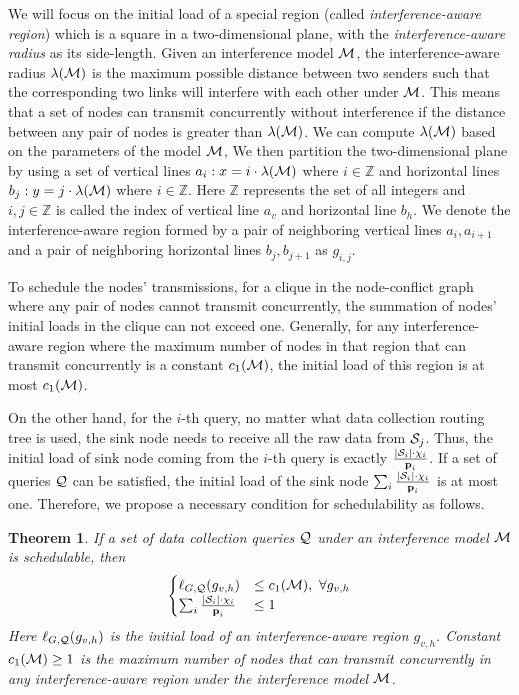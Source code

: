 \documentclass[conference,10pt]{IEEEtran}\usepackage{amsmath}
\newtheorem{boldtheorem}{\textbf{Theorem}}
\def\sources{{\cal S}}
\def\processing{{\chi}}
\def\queryset{{\cal Q}}
\def\period{{\textbf p}}
\def\initiaload{{\ell}}
\def\regionlenth{{\lambda}}
\begin{document}
We will focus on the initial load of a special
region
 (called \emph{interference-aware region})
 which is a square in a two-dimensional plane, with the \emph{interference-aware radius} as its side-length.
Given an interference model $\cal M$, the {interference-aware
radius}
 $\regionlenth({\cal M})$ is the
 maximum possible distance between two senders such that the
 corresponding two links will interfere with each other under $\cal M$.
This means that a set of nodes can transmit concurrently without
interference  if the distance between
 any pair of nodes is greater than
$\regionlenth(\cal M)$.
We can compute $\regionlenth(\cal M)$ based
on the parameters of the
 model $\cal M$,
We then partition the two-dimensional plane by using a set of
vertical lines
 $a_i: x=i \cdot \regionlenth({\cal M})$ where $i\in \mathbb{Z}$
 and horizontal lines $b_j: y=j\cdot \regionlenth({\cal M})$ where
 $i\in \mathbb{Z}$.
Here $\mathbb{Z}$ represents the set of all integers
 and $i, j\in \mathbb{Z}$ is called the index of vertical line $a_v$ and
 horizontal line $b_h$.
We denote the {interference-aware region} formed by a pair of neighboring vertical lines
$a_{i}, a_{i+1}$ and a pair of neighboring horizontal lines $b_{j},
 b_{j+1}$ as $g_{i, j}$.

To schedule the nodes' transmissions,
 for a clique in the node-conflict graph where any pair of nodes cannot transmit concurrently,
 the summation of nodes' initial loads in the clique can not exceed one.
Generally, for any interference-aware region
  where the maximum number of nodes in that region that can
  transmit concurrently is a constant $c_1({\cal M})$,
 the initial load of this region is at most $c_1({\cal M})$.

On the other hand,
for the $i$-th query,
 no matter what data collection routing tree is used,
 the sink node needs to receive all the raw data from $\sources_j$.
Thus, the initial load of sink node
 coming from the $i$-th query is exactly $\frac{|\sources_i| \cdot \processing_i}{\period_i}$.
If a set of queries $\queryset$ can be satisfied,
 the initial load of the sink node $\sum_{i} \frac{|\sources_i| \cdot
\processing_i}{\period_i}$ is at most one. Therefore,
 we propose a necessary condition for schedulability as follows.
\begin{boldtheorem}\label{the:c_x}
If a set of data collection queries $\queryset$ under an
interference model ${\cal M}$ is schedulable, then
\begin{equation}
\begin{cases}
\initiaload_{G,  \queryset}(g_{v,h}) &\le c_1({\cal M}), \ \forall g_{v,h}\\
\sum_{i} \frac{|\sources_i| \cdot \processing_i}{\period_i}  & \le 1
\end{cases}
\end{equation}
Here $\initiaload_{G,  \queryset}(g_{v,h})$ is the initial load of
an
 interference-aware region $g_{v, h}$.
Constant $c_1({\cal M}) \ge 1$ is the maximum number of nodes
 that can transmit concurrently
 in any interference-aware region
 under the interference model ${\cal M}$.
\end{boldtheorem}
\end{document}
